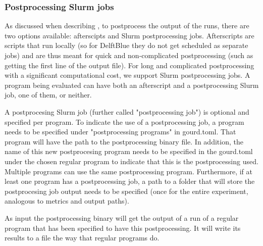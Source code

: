 \documentclass[a4paper,english]{article}
\begin{document}
\begin{adjustwidth}{18pt}{0pt}
            \subsubsection{Postprocessing Slurm jobs}
                As discussed when describing  , to postprocess the output of the runs,
                there are two options available: afterscipts and Slurm postprocessing jobs. Afterscripts are
                scripts that run locally (so for DelftBlue they do not get scheduled as separate jobs) and are
                thus meant for quick and non-complicated postprocessing (such as getting the first line of the
                output file). For long and complicated postprocessing with a significant computational cost,
                we support Slurm postprocessing jobs. A program being evaluated can have both an afterscript
                and a postprocessing Slurm job, one of them, or neither.

                A postprocesing Slurm job (further called "postprocessing job") is optional and specified per
                program. To indicate the use of a postprocessing job, a program needs to be specified under
                "postprocessing programs" in gourd.toml. That program will have the path to the postprocessing
                binary file. In addition, the name of this new postprocesing program needs to be specified in
                the gourd.toml under the chosen regular program to indicate that this is the postprocessing
                used. Multiple programs can use the same postprocessing program. Furthermore, if at least one
                program has a postprocessing job, a path to a folder that will store the postprocesing job
                output needs to be specified (once for the entire experiment, analogous to metrics and output
                paths).

                As input the postprocessing binary will get the output of a run of a regular program that has
                been specified to have this postprocessing. It will write its results to a file the way that
                regular programs do.

%



\end{adjustwidth}
\end{document}
